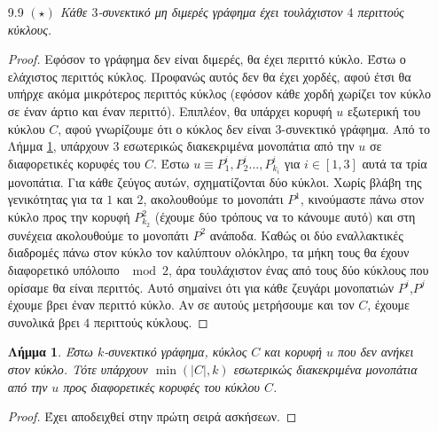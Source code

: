\documentclass[a4paper, oneside, 11pt]{article}
\newtheorem{lm}[thm]{Λήμμα}
\theoremstyle{definition}
\begin{document}
\begin{enumerate}
   \item[9.9] \emph{$(\star)$ Κάθε $3$-συνεκτικό μη διμερές γράφημα έχει τουλάχιστον $4$ περιττούς κύκλους.}
\begin{proof}
	Εφόσον το γράφημα δεν είναι διμερές, θα έχει περιττό κύκλο. Έστω ο ελάχιστος περιττός κύκλος. Προφανώς αυτός δεν θα έχει χορδές, αφού έτσι θα υπήρχε ακόμα μικρότερος περιττός κύκλος (εφόσον
	κάθε χορδή χωρίζει τον κύκλο σε έναν άρτιο και έναν περιττό). Επιπλέον, θα υπάρχει κορυφή $u$ εξωτερική του κύκλου $C$, 
	αφού γνωρίζουμε ότι ο κύκλος δεν είναι $3$-συνεκτικό γράφημα. Από το Λήμμα \ref{lm9.9.1}, υπάρχουν 3 εσωτερικώς διακεκριμένα μονοπάτια από την $u$ σε διαφορετικές κορυφές του $C$. Έστω 
	$u\equiv P_1^i,P_2^i...,P_{k_i}^i$ για $i\in [1,3]$ αυτά τα τρία μονοπάτια. Για κάθε ζεύγος αυτών, σχηματίζονται δύο κύκλοι. Χωρίς βλάβη της γενικότητας για τα $1$ και $2$, ακολουθούμε το
	μονοπάτι $P^1$, κινούμαστε πάνω στον κύκλο προς την κορυφή $P_{k_2}^2$ (έχουμε δύο τρόπους να το κάνουμε αυτό) και στη συνέχεια ακολουθούμε το μονοπάτι $P^2$ ανάποδα. Καθώς οι δύο εναλλακτικές
	διαδρομές πάνω στον κύκλο τον καλύπτουν ολόκληρο, τα μήκη τους θα έχουν διαφορετικό 
	υπόλοιπο $\mod 2$, άρα τουλάχιστον ένας από τους δύο κύκλους που ορίσαμε θα είναι περιττός.
	Αυτό σημαίνει ότι για κάθε ζευγάρι μονοπατιών $P^i$,$P^j$ έχουμε βρει έναν περιττό κύκλο. Αν σε αυτούς
	μετρήσουμε και τον $C$, έχουμε συνολικά βρει $4$ περιττούς κύκλους.
\end{proof}

\begin{lm}
   \label{lm9.9.1}
	Έστω $k$-συνεκτικό γράφημα, κύκλος $C$ και κορυφή $u$ που δεν ανήκει στον κύκλο. Τότε υπάρχουν $\min(|C|,k)$ εσωτερικώς διακεκριμένα μονοπάτια από την $u$ προς διαφορετικές κορυφές του
	κύκλου $C$.
\end{lm}
\begin{proof}
	Έχει αποδειχθεί στην πρώτη σειρά ασκήσεων.
\end{proof}
	
\end{enumerate}
\end{document}
